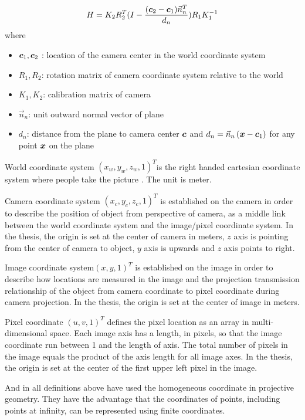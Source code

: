 \begin{align}\label{eq:homography}
H=K_{2}R_{2}^T(I-\frac{(\boldsymbol{c}_{2}-\boldsymbol{c}_{1})\vec{n}_n^{T}}{d_n})R_{1}K_{1}^{-1}
\end{align}
where  
\begin{itemize}
	\item $\boldsymbol{c}_{1},\boldsymbol{c}_{2}$ : location of the camera center in the world coordinate system
	\item $R_{1},R_{2}$: rotation matrix of camera coordinate system relative to the world
	\item $K_{1},K_{2}$: calibration matrix of camera
	\item $\vec{n}_n$: unit outward normal vector of plane
	\item $d_n$: distance from the plane to camera center $\boldsymbol{c}$ and $d_n = \vec{n}_n\left(\boldsymbol{x} - \boldsymbol{c}_{1}\right)$ for any point $\boldsymbol{x}$ on the plane
\end{itemize}

\begin{definition}\label{def: world coordinate system}
	World coordinate system $(x_w, y_w, z_w, 1)^T$is the right handed cartesian coordinate system where people take the picture . The unit is meter.
\end{definition}
\begin{definition}\label{def: camera coordinate system}
	Camera coordinate system $(x_c, y_c, z_c, 1)^T $ is established on the camera in order to describe the position of object from perspective of camera, as a middle link between the world coordinate system and the image/pixel coordinate system. In the thesis,  the origin is set at the center of camera in meters, $z$ axis is pointing from the center of camera to object, $y$ axis is upwards and $z$ axis points to right.
\end{definition}
\begin{definition}\label{def: image coordinate system}
	Image coordinate system$(x, y, 1)^T$ is established on the image in order to describe how locations are measured in the image and the projection transmission relationship of the object from camera coordinate to pixel coordinate during camera projection. In the thesis, the origin is set at the center of image in meters.
\end{definition}
\begin{definition}\label{def: pixel coordinate system}
	Pixel coordinate $(u, v, 1)^T$ defines the pixel location as an array in multi-dimensional space. Each image axis has a length, in pixels, so that the image coordinate run between 1 and the length of axis. The total number of pixels in the image equals the product of the axis length for all image axes. In the thesis, the origin is set at the center of the first upper left pixel in the image.
\end{definition}
And in all definitions above have used the homogeneous coordinate in projective geometry. They have the advantage that the coordinates of points, including points at infinity, can be represented using finite coordinates.
